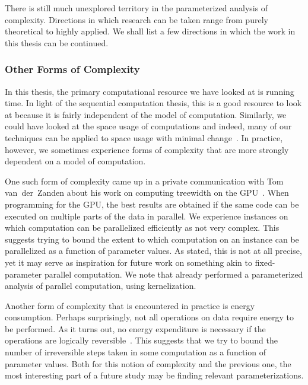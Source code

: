 \label{sec:conclusion:future}%

There is still much unexplored territory in the parameterized analysis of complexity.
Directions in which research can be taken range from purely theoretical to highly applied.
We shall list a few directions in which the work in this thesis can be continued.

\subsubsection{Other Forms of Complexity}
In this thesis, the primary computational resource we have looked at is running time.
In light of the sequential computation thesis, this is a good resource to look at because it is fairly independent of the model of computation.
Similarly, we could have looked at the space usage of computations and indeed, many of our techniques can be applied to space usage with minimal change~\parencite{witteveen2015structural}.
In practice, however, we sometimes experience forms of complexity that are more strongly dependent on a model of computation.

One such form of complexity came up in a private communication with Tom van~der~Zanden about his work on computing treewidth on the GPU~\parencite{vanderzanden2018computing}.
When programming for the GPU, the best results are obtained if the same code can be executed on multiple parts of the data in parallel.
We experience instances on which computation can be parallelized efficiently as not very complex.
This suggests trying to bound the extent to which computation on an instance can be parallelized as a function of parameter values.
As stated, this is not at all precise, yet it may serve as inspiration for future work on something akin to fixed-parameter parallel computation.
We note that \textcite{weller2013aspects} already performed a parameterized analysis of parallel computation, using kernelization.

Another form of complexity that is encountered in practice is energy consumption.
Perhaps surprisingly, not all operations on data require energy to be performed.
As it turns out, no energy expenditure is necessary if the operations are logically reversible~\parencite[Section~8.2]{li2008introduction}.
This suggests that we try to bound the number of irreversible steps taken in some computation as a function of parameter values.
Both for this notion of complexity and the previous one, the most interesting part of a future study may be finding relevant parameterizations.

